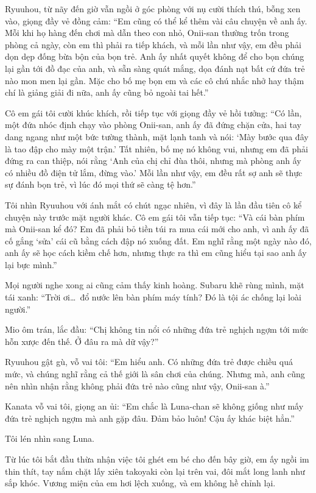 \documentclass[../main.tex]{subfiles}
\begin{document}
Ryuuhou, từ nãy đến giờ vẫn ngồi ở góc phòng với nụ cười thích thú, bỗng xen vào, giọng đầy vẻ đồng cảm: ``Em cũng có thể kể thêm vài câu chuyện về anh ấy. Mỗi khi họ hàng đến chơi mà dẫn theo con nhỏ, Onii-san thường trốn trong phòng cả ngày, còn em thì phải ra tiếp khách, và mỗi lần như vậy, em đều phải dọn dẹp đống bừa bộn của bọn trẻ. Anh ấy nhất quyết không để cho bọn chúng lại gần tới đồ đạc của anh, và sẵn sàng quát mắng, dọa đánh nạt bất cứ đứa trẻ nào mon men lại gần. Mặc cho bố mẹ bọn em và các cô chú nhắc nhở hay thậm chí là giảng giải đi nữa, anh ấy cũng bỏ ngoài tai hết.''

Cô em gái tôi cười khúc khích, rồi tiếp tục với giọng đầy vẻ hồi tưởng: ``Có lần, một đứa nhóc định chạy vào phòng Onii-san, anh ấy đã đứng chặn cửa, hai tay dang ngang như một bức tường thành, mặt lạnh tanh và nói: `Mày bước qua đây là tao đập cho mày một trận.' Tất nhiên, bố mẹ nó không vui, nhưng em đã phải đứng ra can thiệp, nói rằng `Anh của chị chỉ đùa thôi, nhưng mà phòng anh ấy có nhiều đồ điện tử lắm, đừng vào.' Mỗi lần như vậy, em đều rất sợ anh sẽ thực sự đánh bọn trẻ, vì lúc đó mọi thứ sẽ càng tệ hơn.''

Tôi nhìn Ryuuhou với ánh mắt có chút ngạc nhiên, vì đây là lần đầu tiên cô kể chuyện này trước mặt người khác. Cô em gái tôi vẫn tiếp tục: ``Và cái bàn phím mà Onii-san kể đó? Em đã phải bỏ tiền túi ra mua cái mới cho anh, vì anh ấy đã cố gắng `sửa' cái cũ bằng cách đập nó xuống đất. Em nghĩ rằng một ngày nào đó, anh ấy sẽ học cách kiềm chế hơn, nhưng thực ra thì em cũng hiểu tại sao anh ấy lại bực mình.''

Mọi người nghe xong ai cũng cảm thấy kinh hoàng. Subaru khẽ rùng mình, mặt tái xanh: ``Trời ơi\dots\ đổ nước lên bàn phím máy tính? Đó là tội ác chống lại loài người.''

Mio ôm trán, lắc đầu: ``Chị không tin nổi có những đứa trẻ nghịch ngợm tới mức hỗn xược đến thế. Ở đâu ra mà dữ vậy?''

Ryuuhou gật gù, vỗ vai tôi: ``Em hiểu anh. Có những đứa trẻ được chiều quá mức, và chúng nghĩ rằng cả thế giới là sân chơi của chúng. Nhưng mà, anh cũng nên nhìn nhận rằng không phải đứa trẻ nào cũng như vậy, Onii-san à.''

Kanata vỗ vai tôi, giọng an ủi: ``Em chắc là Luna-chan sẽ không giống như mấy đứa trẻ nghịch ngợm mà anh gặp đâu. Đảm bảo luôn! Cậu ấy khác biệt hẳn.''

Tôi lén nhìn sang Luna.

Từ lúc tôi bắt đầu thừa nhận việc tôi ghét em bé cho đến bây giờ, em ấy ngồi im thin thít, tay nắm chặt lấy xiên takoyaki còn lại trên vai, đôi mắt long lanh như sắp khóc. Vương miện của em hơi lệch xuống, và em không hề chỉnh lại.
\end{document}

